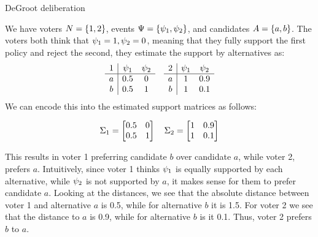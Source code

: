 \begin{example}{DeGroot deliberation}
	{}

	We have voters \(N = \{1,2\}\), events \(\Psi = \{\psi_{1}, \psi_{2}\}\), and candidates \(A = \{a,b\}\). The voters both think that \(\psi_{1} = 1, \psi_{2} = 0\), meaning that they fully support the first policy and reject the second, they estimate the support by alternatives as:
	\[
		\begin{array}{c|cc}
			1 & \psi_1 & \psi_2 \\
			\hline
			a & 0.5       & 0         \\
			b & 0.5       & 1         \\
		\end{array}
		\hspace{1em}
		\begin{array}{c|cc}
			2 & \psi_1 & \psi_2 \\
			\hline
			a & 1         & 0.9       \\
			b & 1         & 0.1       \\
		\end{array}
	\]
	We can encode this into the estimated support matrices as follows:

	\[
		\Sigma_1 =\begin{bmatrix}
			0.5 & 0 \\
			0.5 & 1 \\
		\end{bmatrix}\quad
		\Sigma_2 =\begin{bmatrix}
			1 & 0.9 \\
			1 & 0.1 \\
		\end{bmatrix}
	\]

	This results in voter 1 preferring candidate $b$ over candidate $a$, while voter 2, prefers $a$. Intuitively, since voter 1 thinks $\psi_{1}$ is equally supported by each alternative, while $\psi_{2}$ is not supported by $a$, it makes sense for them to prefer candidate $a$. Looking at the distances, we see that the absolute distance between voter 1 and alternative $a$ is 0.5, while for alternative $b$ it is 1.5. For voter 2 we see that the distance to $a$ is 0.9, while for alternative $b$ is it 0.1. Thus, voter 2 prefers $b$ to $a$.



\end{example}
